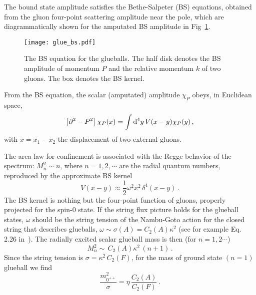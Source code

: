 \documentclass[prl,aps,
showpacs,
preprint,
nofootinbib,
floatfix,
superscriptaddress, showkeys
]{revtex4-1}
\begin{document}
The bound state amplitude satisfies the Bethe-Salpeter (BS) equations, 
obtained from the gluon four-point scattering amplitude near the pole, which 
are diagrammatically shown for the amputated BS amplitude in Fig~\ref{fig3}. 
\begin{figure}[h!]
  \texttt{[image: glue\_bs.pdf]}
  \caption{The BS equation for the glueballs. The half disk denotes the  BS amplitude of momentum $P$ and the relative momentum $k$ of two gluons. The box denotes the BS kernel.}
  \label{fig3}  
\end{figure}

 From the BS equation,  the  scalar (amputated) amplitude $\chi_P$ obeys,
 in  Euclidean space, 
\begin{equation}
\left[\partial^2-P^2\right]\chi_P(x)=\int {\rm d}^4y\,V(x-y) \chi_P(y)\,,
\end{equation}
with $x=x_1-x_2$  the displacement of two external gluons. 

The area law for confinement is associated with the Regge behavior of the  spectrum:
$
M_{n}^2\sim n
$,
where $n=1,2,\cdots$ are the radial quantum numbers, 
reproduced by the approximate BS kernel
\begin{equation}
V(x-y)\approx\frac12\omega^2x^2\,\delta^4(x-y)\,.
\label{kernel}
\end{equation}
The BS kernel is nothing but the four-point function of gluons, properly projected for the spin-0 state.
If the string flux picture holds for the glueball states, $\omega$ should be the string tension of the Nambu-Goto action for the closed string that describes glueballs, $\omega\sim \sigma(A)=C_2(A)\kappa^2$ (see for example Eq. 2.26 in~\cite{Meyer:2004gx}). 
The radially excited scalar glueball mass is then  (for $n=1,2\cdots$)
\begin{equation}
M_{n}^2\sim\, C_2(A)\kappa^2\,(n+1)\,.
\end{equation}
Since the string tension is  $\sigma=\kappa^2\,C_2(F)$,  for the mass of ground state  $(n=1)$ glueball we find
\begin{equation}
\frac{m_{0^{++}}^2}{\sigma}=\eta\,\frac{C_2(A)}{C_2(F)}\,.
\label{casimir}
\end{equation}
\end{document}
